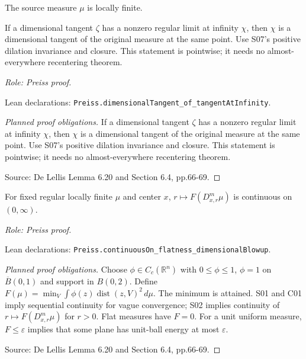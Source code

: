 \begin{lemma}
\label{lem:tangent-blowdown}




The source measure $\mu$ is locally finite.



If a dimensional tangent $\zeta$ has a nonzero regular limit at infinity $\chi$,
then $\chi$ is a dimensional tangent of the original measure at the same point.
Use S07's positive dilation invariance and closure. This statement is pointwise;
it needs no almost-everywhere recentering theorem.
\par\emph{Role: Preiss proof.}
\par Lean declarations: \texttt{Preiss.dimensionalTangent\_of\_tangentAtInfinity}.
\end{lemma}
\begin{proof}[Planned proof obligations]

If a dimensional tangent $\zeta$ has a nonzero regular limit at infinity $\chi$,
then $\chi$ is a dimensional tangent of the original measure at the same point.
Use S07's positive dilation invariance and closure. This statement is pointwise;
it needs no almost-everywhere recentering theorem.
\par Source: De Lellis Lemma 6.20 and Section 6.4, pp.66-69.
\end{proof}

\begin{lemma}
\label{lem:flatness-radius-continuous}




For fixed regular locally finite $\mu$ and center $x$, $r\mapsto F(D^m_{x,r}\mu)$ is continuous on $(0,\infty)$.
\par\emph{Role: Preiss proof.}
\par Lean declarations: \texttt{Preiss.continuousOn\_flatness\_dimensionalBlowup}.
\end{lemma}
\begin{proof}[Planned proof obligations]

Choose $\phi\in C_c(\mathbb R^n)$ with $0\leq\phi\leq1$,
$\phi=1$ on $\overline B(0,1)$ and support in $B(0,2)$.
Define $F(\mu)=\min_V\int\phi(z)\operatorname{dist}(z,V)^2\,d\mu$.
The minimum is attained. S01 and C01 imply sequential continuity for vague
convergence; S02 implies continuity of $r\mapsto F(D^m_{x,r}\mu)$ for $r>0$.
Flat measures have $F=0$. For a unit uniform measure, $F\leq\varepsilon$
implies that some plane has unit-ball energy at most $\varepsilon$.
\par Source: De Lellis Lemma 6.20 and Section 6.4, pp.66-69.
\end{proof}

